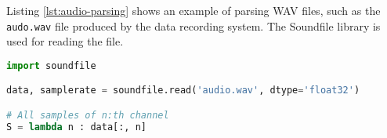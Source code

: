 Listing \ref{lst:audio-parsing} shows an example of parsing WAV files, such as the \texttt{audo.wav} file produced by the data recording system.
The Soundfile \cite{python-soundfile} library is used for reading the file.

\begin{lstlisting}[language=Python, caption={Code example for parsing WAV files},label={lst:audio-parsing}]
import soundfile

data, samplerate = soundfile.read('audio.wav', dtype='float32')

# All samples of n:th channel
S = lambda n : data[:, n]
\end{lstlisting}